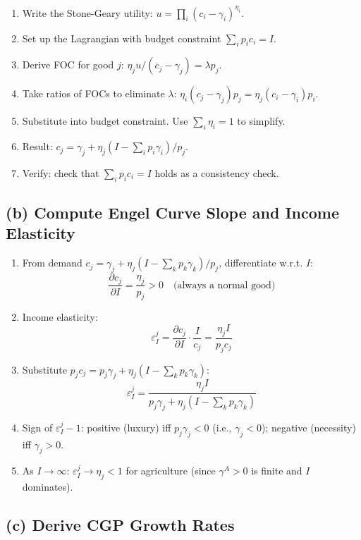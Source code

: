 \documentclass[a4paper,11pt]{article}
\begin{document}
\begin{enumerate}
    \item Write the Stone-Geary utility: $u = \prod_i (c_i - \gamma_i)^{\eta_i}$.
    \item Set up the Lagrangian with budget constraint $\sum_i p_i c_i = I$.
    \item Derive FOC for good $j$: $\eta_j u / (c_j - \gamma_j) = \lambda p_j$.
    \item Take ratios of FOCs to eliminate $\lambda$: $\eta_i (c_j - \gamma_j) p_j = \eta_j (c_i - \gamma_i) p_i$.
    \item Substitute into budget constraint. Use $\sum_i \eta_i = 1$ to simplify.
    \item Result: $c_j = \gamma_j + \eta_j (I - \sum_i p_i \gamma_i) / p_j$.
    \item Verify: check that $\sum_i p_i c_i = I$ holds as a consistency check.
\end{enumerate}

\subsection*{(b) Compute Engel Curve Slope and Income Elasticity}

\begin{enumerate}
    \item From demand $c_j = \gamma_j + \eta_j(I - \sum_k p_k \gamma_k)/p_j$, differentiate w.r.t. $I$:
    \[
    \frac{\partial c_j}{\partial I} = \frac{\eta_j}{p_j} > 0 \quad \text{(always a normal good)}
    \]
    \item Income elasticity:
    \[
    \varepsilon_I^j = \frac{\partial c_j}{\partial I} \cdot \frac{I}{c_j} = \frac{\eta_j I}{p_j c_j}
    \]
    \item Substitute $p_j c_j = p_j \gamma_j + \eta_j (I - \sum_k p_k \gamma_k)$:
    \[
    \varepsilon_I^j = \frac{\eta_j I}{p_j \gamma_j + \eta_j (I - \sum_k p_k \gamma_k)}
    \]
    \item Sign of $\varepsilon_I^j - 1$: positive (luxury) iff $p_j \gamma_j < 0$ (i.e., $\gamma_j < 0$); negative (necessity) iff $\gamma_j > 0$.
    \item As $I \to \infty$: $\varepsilon_I^j \to \eta_j < 1$ for agriculture (since $\gamma^A > 0$ is finite and $I$ dominates).
\end{enumerate}

\subsection*{(c) Derive CGP Growth Rates}
\end{document}
